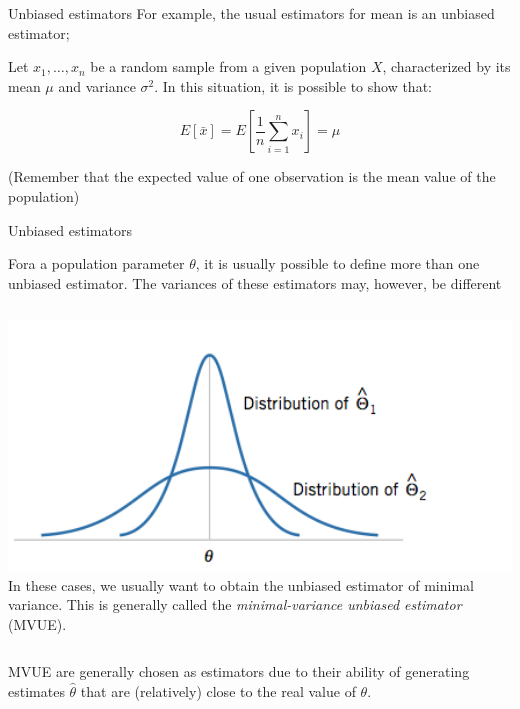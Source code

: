 \begin{frame}{Unbiased estimators}
For example, the usual estimators for mean is an unbiased estimator;
\bigskip

Let $x_1,\ldots,x_n$ be a random sample from a given population $X$, characterized by its mean $\mu$ and variance $\sigma^2$. In this situation, it is possible to show that:
\bigskip

\begin{equation*}
E\left[\bar{x}\right] = E\left[\frac{1}{n}\sum\limits_{i=1}^{n}x_i\right] = \mu
\end{equation*}
\vfill

(Remember that the expected value of one observation is the mean value of the population)

\end{frame}

\begin{frame}{Unbiased estimators}

Fora a population parameter $\theta$, it is usually possible to define more than one unbiased estimator. The variances of these estimators may, however, be different\bigskip

\begin{columns}[T]
    \vspace{-1.5em} \includegraphics[width=1\textwidth]{../img/unbiased_variance.png}
     In these cases, we usually want to obtain the unbiased estimator of minimal variance. This is generally called the \textit{minimal-variance unbiased estimator} (MVUE).
\end{columns}\bigskip

MVUE are generally chosen as estimators due to their ability of generating estimates $\hat{\theta}$ that are (relatively) close to the real value of $\theta$.
\end{frame}


